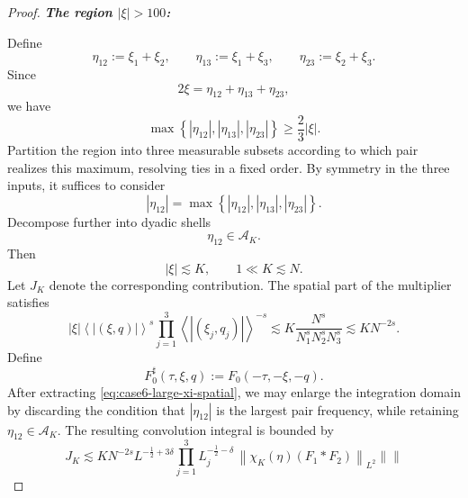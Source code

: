 \documentclass[12pt,oneside,reqno]{amsart}
\numberwithin{equation}{section}
\theoremstyle{plain}
\newcommand{\abs}[1]{%
    \left|#1\right|%
}
\newcommand{\norm}[1]{%
    \left\lVert #1\right\rVert%
}
\newcommand{\inp}[1]{%
    \left\langle #1\right\rangle
}
\newcommand{\brs}[1]{%
    \left\{#1\right\}
}
\begin{document}
\begin{proof}
\medskip
\noindent
\textbf{\emph{The region $\abs{\xi}>100$:}}

Define
\begin{equation}
    \eta_{12}:=\xi_1+\xi_2,
    \qquad
    \eta_{13}:=\xi_1+\xi_3,
    \qquad
    \eta_{23}:=\xi_2+\xi_3.
\end{equation}
Since
\begin{equation}
    2\xi
    =
    \eta_{12}+\eta_{13}+\eta_{23},
\end{equation}
we have
\begin{equation}
\label{eq:case6-dominant-pair-lower-bound}
    \max
    \brs{
        \abs{\eta_{12}},
        \abs{\eta_{13}},
        \abs{\eta_{23}}
    }
    \geq
    \frac23\abs{\xi}.
\end{equation}
Partition the region into three measurable subsets according to which
pair realizes this maximum, resolving ties in a fixed order.
By symmetry in the three inputs, it suffices to consider
\begin{equation}
    \abs{\eta_{12}}
    =
    \max
    \brs{
        \abs{\eta_{12}},
        \abs{\eta_{13}},
        \abs{\eta_{23}}
    }.
\end{equation}
Decompose further into dyadic shells
\begin{equation}
    \eta_{12}\in\mathcal A_K.
\end{equation}
Then
\begin{equation}
\label{eq:case6-K-relations}
    \abs{\xi}\lesssim K,
    \qquad
    1\ll K\lesssim N.
\end{equation}
Let $J_K$ denote the corresponding contribution. The spatial part of
the multiplier satisfies
\begin{equation}
\abs{\xi} \inp{\abs{(\xi,q)}}^s \prod_{j=1}^3
    \inp{\abs{(\xi_j,q_j)}}^{-s}
\lesssim
K
\frac{N^s}{N_1^sN_2^sN_3^s}
\lesssim
KN^{-2s}.
\label{eq:case6-large-xi-spatial}
\end{equation}
Define
\begin{equation}
    F_0^\sharp(\tau,\xi,q)
    :=
    F_0(-\tau,-\xi,-q).
\end{equation}
After extracting \eqref{eq:case6-large-xi-spatial}, we may enlarge
the integration domain by discarding the condition that
$\abs{\eta_{12}}$ is the largest pair frequency, while retaining
$\eta_{12}\in\mathcal A_K$. The resulting convolution integral is
bounded by
\begin{equation}
J_K
\lesssim
KN^{-2s}
L^{-\frac12+3\delta}
\prod_{j=1}^3
L_j^{-\frac12-\delta}
\,
\norm{
    \chi_K(\eta)(F_1*F_2)
}_{L^2}
\norm{
}
\end{equation}
\end{proof}
\end{document}
